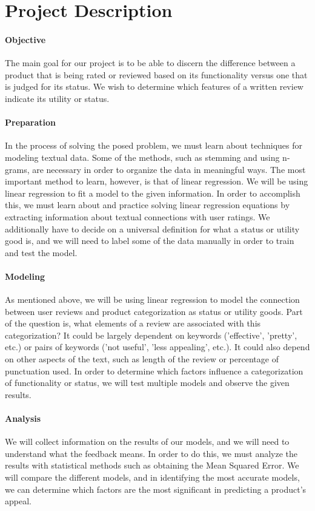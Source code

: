 \documentclass[dvips,12pt]{article}
\begin{document}
\section{Project Description}

\paragraph{Objective}
The main goal for our project is to be able to discern the difference between a product that is being rated or reviewed based on its functionality versus one that is judged for its status. We wish to determine which features of a written review indicate its utility or status.

\paragraph{Preparation}
In the process of solving the posed problem, we must learn about techniques for modeling textual data. Some of the methods, such as stemming and using n-grams, are necessary in order to organize the data in meaningful ways. The most important method to learn, however, is that of linear regression. We will be using linear regression to fit a model to the given information. In order to accomplish this, we must learn about and practice solving linear regression equations by extracting information about textual connections with user ratings. We additionally have to decide on a universal definition for what a status or utility good is, and we will need to label some of the data manually in order to train and test the model. 

\paragraph{Modeling}
As mentioned above, we will be using linear regression to model the connection between user reviews and product categorization as status or utility goods. Part of the question is, what elements of a review are associated with this categorization? It could be largely dependent on keywords ('effective', 'pretty', etc.) or pairs of keywords ('not useful', 'less appealing', etc.). It could also depend on other aspects of the text, such as length of the review or percentage of punctuation used. In order to determine which factors influence a categorization of functionality or status, we will test multiple models and observe the given results.

\paragraph{Analysis}
We will collect information on the results of our models, and we will need to understand what the feedback means. In order to do this, we must analyze the results with statistical methods such as obtaining the Mean Squared Error. We will compare the different models, and in identifying the most accurate models, we can determine which factors are the most significant in predicting a product's appeal.
\end{document}

